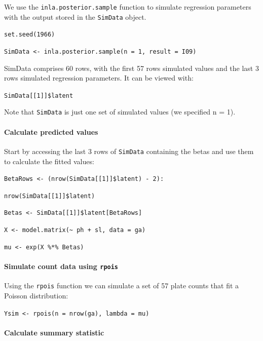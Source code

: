 \documentclass[
]{book}
\begin{document}
We use the \texttt{inla.posterior.sample} function to simulate regression parameters with the output stored in the \texttt{SimData} object.

\texttt{set.seed(1966)}

\texttt{SimData\ \textless{}-\ inla.posterior.sample(n\ =\ 1,\ result\ =\ I09)}

SimData comprises 60 rows, with the first 57 rows simulated values and the last 3 rows simulated regression parameters. It can be viewed with:

\texttt{SimData{[}{[}1{]}{]}\$latent}

Note that \texttt{SimData} is just one set of simulated values (we specified n = 1).

\hypertarget{calculate-predicted-values}{%
\paragraph{Calculate predicted values}\label{calculate-predicted-values}}

Start by accessing the last 3 rows of \texttt{SimData} containing the betas and use them to calculate the fitted values:

\texttt{BetaRows\ \textless{}-\ (nrow(SimData{[}{[}1{]}{]}\$latent)\ -\ 2):}

\texttt{nrow(SimData{[}{[}1{]}{]}\$latent)}

\texttt{Betas\ \textless{}-\ SimData{[}{[}1{]}{]}\$latent{[}BetaRows{]}}

\texttt{X\ \textless{}-\ model.matrix(\textasciitilde{}\ ph\ +\ sl,\ data\ =\ ga)}

\texttt{mu\ \textless{}-\ exp(X\ \%*\%\ Betas)}

\hypertarget{simulate-count-data-using-rpois}{%
\paragraph{\texorpdfstring{Simulate count data using \texttt{rpois}}{Simulate count data using rpois}}\label{simulate-count-data-using-rpois}}

Using the \texttt{rpois} function we can simulate a set of 57 plate counts that fit a Poisson distribution:

\texttt{Ysim\ \textless{}-\ rpois(n\ =\ nrow(ga),\ lambda\ =\ mu)}

\hypertarget{calculate-summary-statistic}{%
\paragraph{Calculate summary statistic}\label{calculate-summary-statistic}}
\end{document}
